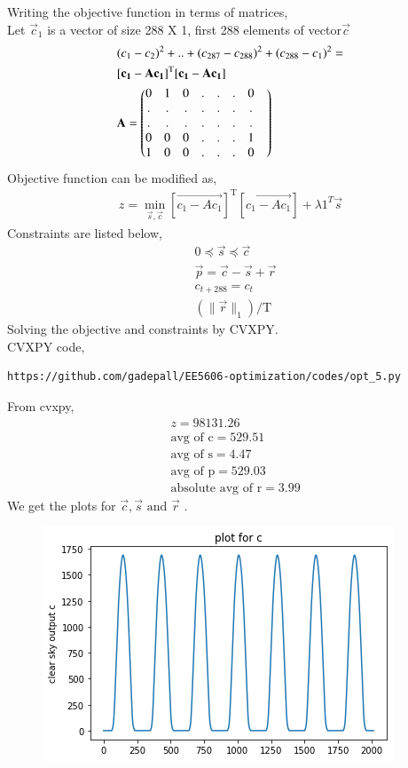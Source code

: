 \documentclass[journal,12pt,twocolumn]{IEEEtran}
\begin{document}
\begin{enumerate}
 Writing the objective function in terms of matrices,\\
 Let $\vec{c}_1$ is a vector of size 288 X 1, first 288 elements of vector$\vec{c}$
 \begin{align}
 &(c_1 - c_2)^2 + ..+(c_{287} -c_{288})^2 + (c_{288} - c_{1})^2 = \nonumber \\
 &[\mathbf{c_1 - A c_1}]^\text{T} [\mathbf{c_1 - A c_1}]	\\
 &\mathbf{A} = \begin{pmatrix}0&1&0&.&.&.&0\\.&.&.&.&.&.&.&\\.&.&.&.&.&.&.&\\0&0&0&.&.&.&1\\1&0&0&.&.&.&0\end{pmatrix}
\end{align} 
Objective function can be modified as,
\begin{align}
 z= \min_{\vec{s},\vec{c}} [\vec{c_1 - A c_1}]^\text{T} [\vec{c_1 - A c_1}] + \lambda1^T\vec{s}
\end{align}
Constraints are listed below,
\begin{align}
&0 \preceq \vec{s} \preceq \vec{c}\\
& \vec{p}=\vec{c}-\vec{s}+\vec{r}\\
& c_{t+288} = c_t\\
& (\|\vec{r}\|_1)/\text{T}
\end{align}
Solving the objective and constraints by CVXPY.\\
CVXPY code,
\begin{lstlisting}
https://github.com/gadepall/EE5606-optimization/codes/opt_5.py
\end{lstlisting}
From cvxpy, 
\begin{align}
& z= 98131.26\\
&\text{avg of c} = 529.51\\
& \text{avg of s} =4.47 \\
& \text{avg of p} = 529.03\\
& \text{absolute avg of r} = 3.99
\end{align}
We get the plots for  $\vec{c} ,\vec{s}  \text{ and }  \vec{r}$ .
\begin{figure}[H]
	\centering
    \includegraphics[width=\columnwidth]{c.png}

\end{figure}
\end{enumerate}
\end{document}
